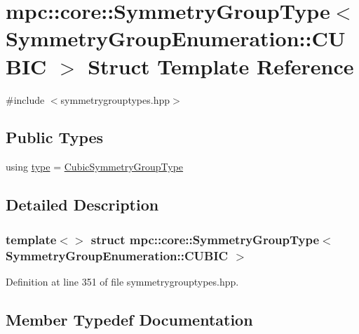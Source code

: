 \hypertarget{structmpc_1_1core_1_1_symmetry_group_type_3_01_symmetry_group_enumeration_1_1_c_u_b_i_c_01_4}{}\section{mpc\+:\+:core\+:\+:Symmetry\+Group\+Type$<$ Symmetry\+Group\+Enumeration\+:\+:C\+U\+B\+IC $>$ Struct Template Reference}
\label{structmpc_1_1core_1_1_symmetry_group_type_3_01_symmetry_group_enumeration_1_1_c_u_b_i_c_01_4}


{\ttfamily \#include $<$symmetrygrouptypes.\+hpp$>$}

\subsection*{Public Types}
\begin{DoxyCompactItemize}
\item 
using \mbox{\hyperlink{structmpc_1_1core_1_1_symmetry_group_type_3_01_symmetry_group_enumeration_1_1_c_u_b_i_c_01_4_a381fca992534548373952578220385cb}{type}} = \mbox{\hyperlink{structmpc_1_1core_1_1_cubic_symmetry_group_type}{Cubic\+Symmetry\+Group\+Type}}
\end{DoxyCompactItemize}


\subsection{Detailed Description}
\subsubsection*{template$<$$>$\newline
struct mpc\+::core\+::\+Symmetry\+Group\+Type$<$ Symmetry\+Group\+Enumeration\+::\+C\+U\+B\+I\+C $>$}



Definition at line 351 of file symmetrygrouptypes.\+hpp.



\subsection{Member Typedef Documentation}
\mbox{\label{structmpc_1_1core_1_1_symmetry_group_type_3_01_symmetry_group_enumeration_1_1_c_u_b_i_c_01_4_a381fca992534548373952578220385cb}} 
